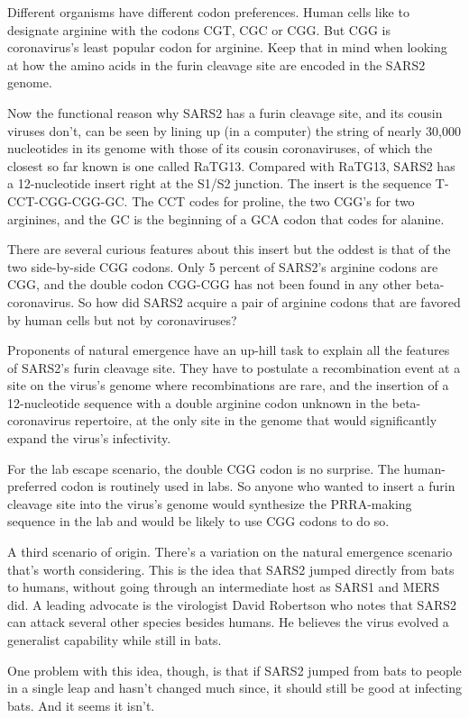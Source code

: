 \documentclass[
]{book}
\begin{document}
Different organisms have different codon preferences. Human cells like to designate arginine with the codons CGT, CGC or CGG. But CGG is coronavirus's least popular codon for arginine. Keep that in mind when looking at how the amino acids in the furin cleavage site are encoded in the SARS2 genome.

Now the functional reason why SARS2 has a furin cleavage site, and its cousin viruses don't, can be seen by lining up (in a computer) the string of nearly 30,000 nucleotides in its genome with those of its cousin coronaviruses, of which the closest so far known is one called RaTG13. Compared with RaTG13, SARS2 has a 12-nucleotide insert right at the S1/S2 junction. The insert is the sequence T-CCT-CGG-CGG-GC. The CCT codes for proline, the two CGG's for two arginines, and the GC is the beginning of a GCA codon that codes for alanine.

There are several curious features about this insert but the oddest is that of the two side-by-side CGG codons. Only 5 percent of SARS2's arginine codons are CGG, and the double codon CGG-CGG has not been found in any other beta-coronavirus. So how did SARS2 acquire a pair of arginine codons that are favored by human cells but not by coronaviruses?

Proponents of natural emergence have an up-hill task to explain all the features of SARS2's furin cleavage site. They have to postulate a recombination event at a site on the virus's genome where recombinations are rare, and the insertion of a 12-nucleotide sequence with a double arginine codon unknown in the beta-coronavirus repertoire, at the only site in the genome that would significantly expand the virus's infectivity.

For the lab escape scenario, the double CGG codon is no surprise. The human-preferred codon is routinely used in labs. So anyone who wanted to insert a furin cleavage site into the virus's genome would synthesize the PRRA-making sequence in the lab and would be likely to use CGG codons to do so.

A third scenario of origin. There's a variation on the natural emergence scenario that's worth considering. This is the idea that SARS2 jumped directly from bats to humans, without going through an intermediate host as SARS1 and MERS did. A leading advocate is the virologist David Robertson who notes that SARS2 can attack several other species besides humans. He believes the virus evolved a generalist capability while still in bats.

One problem with this idea, though, is that if SARS2 jumped from bats to people in a single leap and hasn't changed much since, it should still be good at infecting bats. And it seems it isn't.
\end{document}
